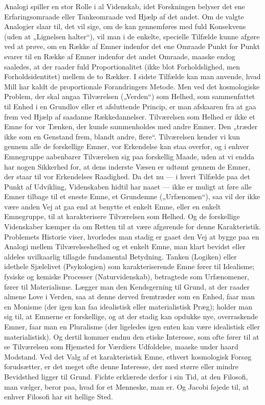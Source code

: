 \documentclass[12pt,a4paper,openany]{book}
\newcommand{\opage}[1]{\marginnote{\footnotesize\textit{[#1]}}}
\begin{document}
Analogi spiller en stor Rolle i al Videnskab, idet Forskningen belyser
det ene Erfaringsomraade eller Tankeomraade ved Hjælp af
det andet. Om de valgte Analogier slaar til, det vil sige, om de kan
gennemføres med fuld Konsekvens (uden at „Lignelsen halter“), vil
man i de enkelte, specielle Tilfælde kunne afgøre ved at prøve, om
en Række af Emner indenfor det ene Omraade Punkt for Punkt svarer
til en Række af Emner indenfor det andet Omraade, maaske
endog saaledes, at der raader fuld Proportionalitet (ikke blot Forholdslighed,
men Forholdsidentitet) mellem de to Rækker. I sidste
Tilfælde kan man anvende, hvad Mill har kaldt de proportionale
Forandringers Metode. Men ved det kosmologiske Problem, der skal
angaa Tilværelsen („Verden“) som Helhed, som sammenfattet til
Enhed i en Grundlov eller et afsluttende Princip, er man afskaaren
fra at gaa frem ved Hjælp af saadanne Rækkedannelser. Tilværelsen
som Helhed er ikke et Emne for vor Tænken, der kunde sammenholdes
med andre Emner. Den „træder ikke som en Genstand frem,
blandt andre, flere“. Tilværelsen kender vi kun gennem alle de forskellige
Emner, vor Erkendelse kan staa overfor, og i enhver Emnegruppe
aabenbarer Tilværelsen sig paa forskellig Maade, uden at vi
endda har nogen Sikkerhed for, at dens inderste Væsen er udtømt gennem
de Emner, der staar til vor Erkendelses Raadighed. Da det nu
--- i hvert Tilfælde paa det Punkt af Udvikling, Videnskaben hidtil
har naaet --- ikke er muligt at føre alle Emner tilbage til et eneste
Emne, et Grundemne („Urfænomen“), saa vil der ikke være anden
Vej at gaa end at benytte et enkelt Emne, eller en enkelt Emnegruppe,
til at karakterisere Tilværelsen som Helhed. Og de forskellige
Videnskaber kæmper da om Retten til at være afgørende for denne
\opage{84}Karakteristik. Problemets Historie viser, hvorledes man stadig er
gaaet den Vej at bygge paa en Analogi mellem Tilværelseshelhed og
et enkelt Emne, man klart bevidst eller aldeles uvilkaarlig tillagde
fundamental Betydning. Tanken (Logiken) eller idethele Sjælelivet
(Psykologien) som karakteriserende Emne fører til Idealisme; fysiske
og kemiske Processer (Naturvidenskab), betragtede som Urfænomener,
fører til Materialisme. Lægger man den Kendsgerning til
Grund, at der raader almene Love i Verden, saa at denne derved fremtræder
som en Enhed, faar man en Monisme (der igen kan faa
idealistisk eller materialistisk Præg); holder man sig til, at Emnerne
er forskellige, og at der stadig kan opdukke nye, overraskende Emner,
faar man en Pluralisme (der ligeledes igen enten kan være
idealistisk eller materialistisk). Og dertil kommer endnu den etiske
Interesse, som ofte fører til at se Tilværelsen som Hjemsted for Værdiers
Udfoldelse, maaske under haard Modstand. Ved det Valg af et
karakteristisk Emne, ethvert kosmologisk Forsøg forudsætter, er det
meget ofte denne Interesse, der med større eller mindre Bevidsthed
ligger til Grund. Fichte erklærede derfor i sin Tid, at den Filosofi,
man vælger, beror paa, hvad for et Menneske, man er. Og Jacobi
føjede til, at enhver Filosofi har sit hellige Sted.
\end{document}
